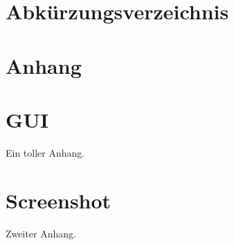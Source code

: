 \documentclass[12pt,a4paper, listof=entryprefix, bibliography=totocnumbered,toc=listofnumbered]{scrartcl}
\newcounter{verzeichnis}
\begin{document}
	\listoffigures
	\pagebreak
	
	\listoftables
	\pagebreak
	
	\section{Abkürzungsverzeichnis}
	\vspace{-6em} %
	\printnoidxglossary[type=\acronymtype,style=alttree,title=,toctitle=] %
	\newpage

\setcounter{page}{1}  %
\begin{appendix}
	 \label{Anhang}
	\section*{Anhang} %
	\renewcommand{\thesection}{\Roman{section}}
	
	\setcounter{section}{0} %
	\section{GUI}
	\label{app:gui}
	Ein toller Anhang.
	
	\section{Screenshot}
	\label{app:screenshot}
	Zweiter Anhang.
\end{appendix}
\end{document}
